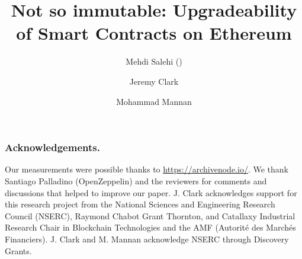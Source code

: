 \documentclass[envcountsect]{llncs}
\begin{document}
\frontmatter
\mainmatter

\title{Not so immutable: Upgradeability of Smart Contracts on Ethereum}

\author{Mehdi Salehi (\Letter) \and Jeremy Clark \and Mohammad Mannan}
 
\maketitle







%
%



\subsubsection*{Acknowledgements.} Our measurements were possible thanks to \url{https://archivenode.io/}. We thank Santiago Palladino (OpenZeppelin) and the reviewers for comments and discussions that helped to improve our paper. J. Clark acknowledges support for this research project from the National Sciences and Engineering Research Council (NSERC), Raymond Chabot Grant Thornton, and Catallaxy Industrial Research Chair in Blockchain Technologies and the AMF (Autorité des Marchés Financiers). J. Clark and M. Mannan acknowledge NSERC through Discovery Grants. 






\clearpage
\appendix




\end{document}
